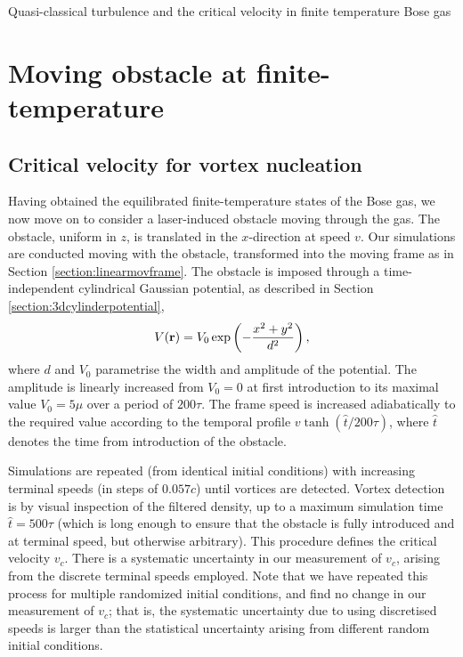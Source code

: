 \begin{chapter}{\label{cha:nonequib}Quasi-classical turbulence and the critical velocity in finite temperature Bose gas}
\section{Moving obstacle at finite-temperature\label{sec:obstacle}}
\subsection{Critical velocity for vortex nucleation}
Having obtained the equilibrated finite-temperature states of the Bose gas, we now move on to consider a laser-induced obstacle moving through the gas.  The obstacle, uniform in $z$, is translated in the $x$-direction at speed $v$.  Our simulations are conducted moving with the obstacle, transformed into the moving frame as in Section \ref{section:linearmovframe}. The obstacle is imposed through a time-independent cylindrical Gaussian potential, as described in Section \ref{section:3dcylinderpotential},
\begin{equation*}
  V({\bf r}) = V_0 \exp\left ( -\frac{x^2+y^2}{d^2}\right ),
\end{equation*}
where $d$ and $V_0$ parametrise the width and amplitude of the potential. The amplitude is linearly increased from $V_0 = 0$ at first introduction to its maximal value $V_0=5\mu$ over a period of $200\tau$.   The frame speed is increased adiabatically to the required value according to the temporal profile $v \tanh(\hat{t}/200 \tau)$, where $\hat{t}$ denotes the time from introduction of the obstacle.

Simulations are repeated (from identical initial conditions) with increasing terminal speeds (in steps of $0.057c$) until vortices are detected.  Vortex detection is by visual inspection of the filtered density, up to a maximum simulation time $\hat{t}=500\tau$ (which is long enough to ensure that the obstacle is fully introduced and at terminal speed, but otherwise arbitrary). This procedure defines the critical velocity $v_c$.  There is a systematic uncertainty in our measurement of $v_c$, arising from the discrete terminal speeds employed.  Note that we have repeated this process for multiple randomized initial conditions, and find no change in our measurement of $v_c$; that is, the systematic uncertainty due to using discretised speeds is larger than the statistical uncertainty arising from different random initial conditions.


\end{chapter}
